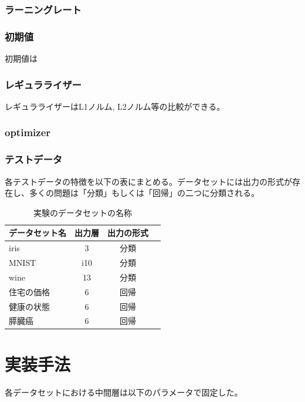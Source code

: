 \subsubsection{ラーニングレート}

\subsubsection{初期値}
初期値は
\subsubsection{レギュラライザー}
レギュラライザーはL1ノルム, L2ノルム等の比較ができる。
\subsubsection{optimizer}
\subsubsection{テストデータ}
各テストデータの特徴を以下の表にまとめる。データセットには出力の形式が存在し、多くの問題は「分類」もしくは「回帰」の二つに分類される。


\begin{table}[htbp]
    \begin{center}
        \caption{実験のデータセットの名称}
        \begin{tabular}{l*{2}{c}r}
        データセット名      & 出力層 & 出力の形式 \\
        \hline
        iris            & 3  & 分類 \\
        MNIST               & i10 & 分類  \\
        wine        & 13 & 分類 \\
        住宅の価格           & 6 & 回帰 \\
        健康の状態           & 6 & 回帰 \\
        膵臓癌           & 6 & 回帰 \\
        \end{tabular}
    \end{center}
\end{table}



\section{実装手法}

各データセットにおける中間層は以下のパラメータで固定した。


